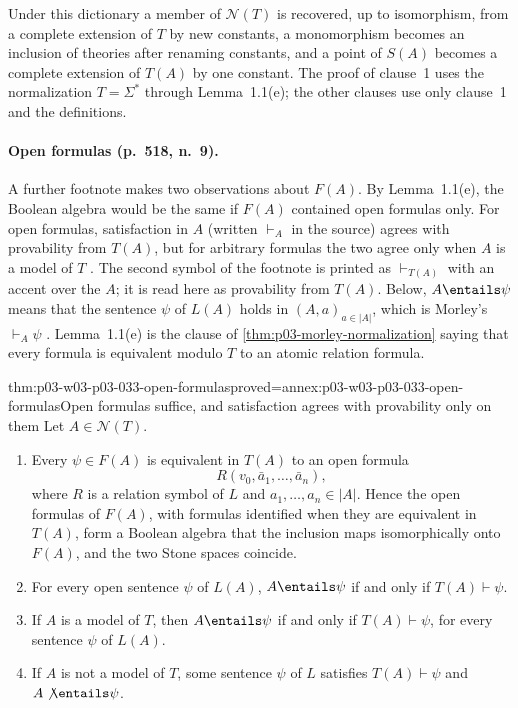 Under this dictionary a member of \(\mathcal N(T)\) is recovered, up to
isomorphism, from a complete extension of \(T\) by new constants, a
monomorphism becomes an inclusion of theories after renaming constants,
and a point of \(S(A)\) becomes a complete extension of \(T(A)\) by one
constant. The proof of clause~1 uses the normalization
\(T=\Sigma^*\) through Lemma~1.1(e); the other clauses use only clause~1
and the definitions.

\paragraph{Open formulas (p.~518, n.~9).} A further footnote makes two
observations about \(F(A)\). By Lemma~1.1(e), the Boolean algebra would be
the same if \(F(A)\) contained open formulas only. For open formulas,
satisfaction in \(A\) (written \(\vdash_A\) in the source) agrees with
provability from \(T(A)\), but for arbitrary formulas the two agree only
when \(A\) is a model of \(T\) \cite[p.~518, n.~9]{Morley1965}. The
second symbol of the footnote is printed as \(\vdash_{T(A)}\) with an
accent over the \(A\); it is read here as provability from \(T(A)\). Below,
\(A\entails\psi\) means that the sentence \(\psi\) of \(L(A)\) holds in
\((A,a)_{a\in|A|}\), which is Morley's \(\vdash_A\psi\)
\cite[p.~516]{Morley1965}. Lemma~1.1(e) is the clause of
\cref{thm:p03-morley-normalization} saying that every formula is
equivalent modulo \(T\) to an atomic relation formula.

\begin{hbtheorem}{thm:p03-w03-p03-033-open-formulas}{proved=annex:p03-w03-p03-033-open-formulas}{Open formulas suffice, and satisfaction agrees with provability only on them}
Let \(A\in\mathcal N(T)\).
\begin{enumerate}
\item Every \(\psi\in F(A)\) is equivalent in \(T(A)\) to an open formula
\[
 R(v_0,\bar a_1,\dots,\bar a_n),
\]
where \(R\) is a relation symbol of
\(L\) and \(a_1,\dots,a_n\in|A|\). Hence the open formulas of \(F(A)\),
with formulas identified when they are equivalent in \(T(A)\), form a
Boolean algebra that the inclusion maps isomorphically onto \(F(A)\), and
the two Stone spaces coincide.
\item For every open sentence \(\psi\) of \(L(A)\),
\(A\entails\psi\) if and only if \(T(A)\vdash\psi\).
\item If \(A\) is a model of \(T\), then \(A\entails\psi\) if and only if
\(T(A)\vdash\psi\), for every sentence \(\psi\) of \(L(A)\).
\item If \(A\) is not a model of \(T\), some sentence \(\psi\) of \(L\)
satisfies \(T(A)\vdash\psi\) and \(A\not\entails\psi\).
\end{enumerate}
\end{hbtheorem}

